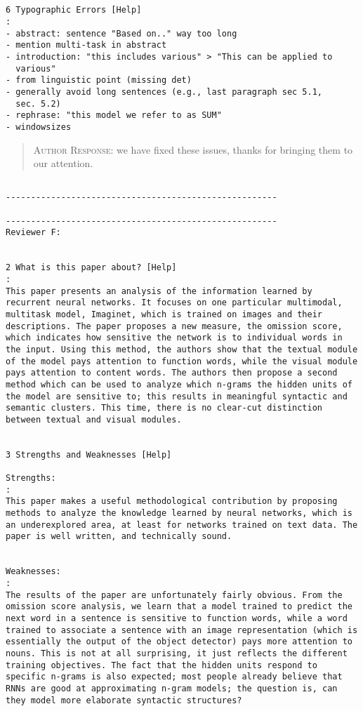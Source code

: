 \begin{verbatim}


6 Typographic Errors [Help]
: 
- abstract: sentence "Based on.." way too long
- mention multi-task in abstract
- introduction: "this includes various" > "This can be applied to
  various"
- from linguistic point (missing det)
- generally avoid long sentences (e.g., last paragraph sec 5.1,
  sec. 5.2)
- rephrase: "this model we refer to as SUM"
- windowsizes
\end{verbatim}  
\begin{quote}
\textsc{Author Response:}  we have fixed these issues, thanks for bringing them to our attention.
\end{quote}
\begin{verbatim}

------------------------------------------------------

------------------------------------------------------
Reviewer F:


2 What is this paper about? [Help]
: 
This paper presents an analysis of the information learned by
recurrent neural networks. It focuses on one particular multimodal,
multitask model, Imaginet, which is trained on images and their
descriptions. The paper proposes a new measure, the omission score,
which indicates how sensitive the network is to individual words in
the input. Using this method, the authors show that the textual module
of the model pays attention to function words, while the visual module
pays attention to content words. The authors then propose a second
method which can be used to analyze which n-grams the hidden units of
the model are sensitive to; this results in meaningful syntactic and
semantic clusters. This time, there is no clear-cut distinction
between textual and visual modules.


3 Strengths and Weaknesses [Help]

Strengths:
: 
This paper makes a useful methodological contribution by proposing
methods to analyze the knowledge learned by neural networks, which is
an underexplored area, at least for networks trained on text data. The
paper is well written, and technically sound.


Weaknesses:
: 
The results of the paper are unfortunately fairly obvious. From the
omission score analysis, we learn that a model trained to predict the
next word in a sentence is sensitive to function words, while a word
trained to associate a sentence with an image representation (which is
essentially the output of the object detector) pays more attention to
nouns. This is not at all surprising, it just reflects the different
training objectives. The fact that the hidden units respond to
specific n-grams is also expected; most people already believe that
RNNs are good at approximating n-gram models; the question is, can
they model more elaborate syntactic structures?
\end{verbatim}  
